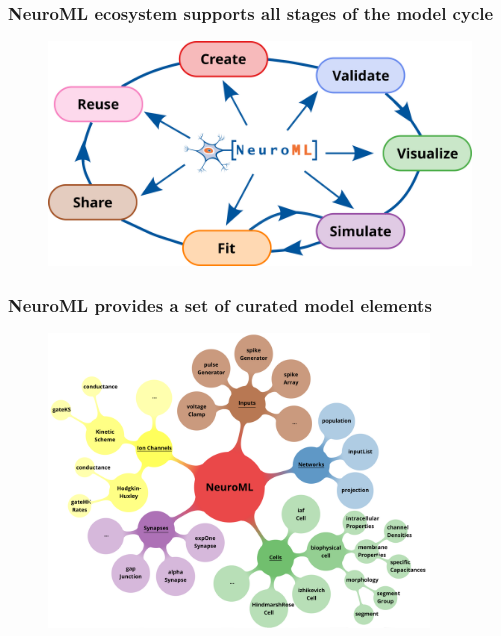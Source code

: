 \begin{frame}[c]
  \frametitle{NeuroML ecosystem supports all stages of the model cycle}
  \begin{figure}[h]
    \centering
    \includegraphics[width=\textwidth]{99_images/ecosystem}
  \end{figure}
\end{frame}
\begin{frame}[c]
  \frametitle{NeuroML provides a set of curated model elements}
  \begin{figure}[h]
    \centering
    \includegraphics[width=0.9\textwidth]{99_images/neuroml-mindmap}
  \end{figure}%
\end{frame}
